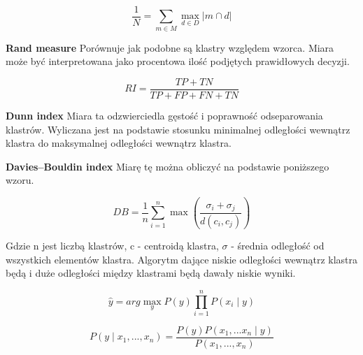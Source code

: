 \documentclass[12pt,a4paper]{article}
\begin{document}
$$ \frac{1}{N} = \sum_{m \in M} \max_{d \in D} | m \cap d |   $$

\textbf{Rand measure}
Porównuje jak podobne są klastry względem wzorca. Miara może być interpretowana jako procentowa ilość podjętych prawidłowych decyzji.

$$ RI = \frac{TP + TN}{TP + FP + FN + TN}$$

\textbf{Dunn index}
Miara ta odzwierciedla gęstość i poprawność odseparowania klastrów. Wyliczana jest na podstawie stosunku minimalnej odległości wewnątrz klastra do maksymalnej odległości wewnątrz klastra.

\textbf{Davies–Bouldin index}
Miarę tę można obliczyć na podstawie poniższego wzoru.

$$ DB = \frac{1}{n} \sum_{i=1}^{n} \max{(\frac{\sigma _{i} + \sigma _{j}}{d(c_i, c_j)})}   $$

Gdzie n jest liczbą klastrów, c - centroidą klastra, $ \sigma $ - średnia odległość od wszystkich elementów klastra. Algorytm dające niskie odległości wewnątrz klastra będą i duże odległości między klastrami będą dawały niskie wyniki.

$$  \hat{y} = arg \max_{y} P(y) \prod_{i=1}^{n} P(x_{i} \mid y) $$

$$ P(y\mid x_{1},..., x_{n}) = 
\frac
{P(y)P(x_{1},...x_{n}\mid y)}
{P(x_{1},...,x_{n})}
$$
\end{document}
